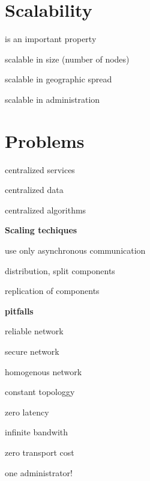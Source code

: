 \documentclass[ngerman,a4paper]{report}
\begin{document}
\section{Scalability} is an important property

\begin{compactitem}
\item scalable in size (number of nodes)
\item scalable in geographic spread
\item scalable in administration
\end{compactitem}

\section{Problems}

\begin{compactitem}
\item centralized services
\item centralized data
\item centralized algorithms
\end{compactitem}

\textbf{Scaling techiques}

\begin{compactitem}
\item use only asynchronous communication
\item distribution, split components
\item replication of components
\end{compactitem}

\textbf{pitfalls}

\begin{compactenum}
\item reliable network
\item secure network
\item homogenous network
\item constant topologgy
\item zero latency
\item infinite bandwith
\item zero transport cost
\item one administrator!
\end{compactenum}
\end{document}
